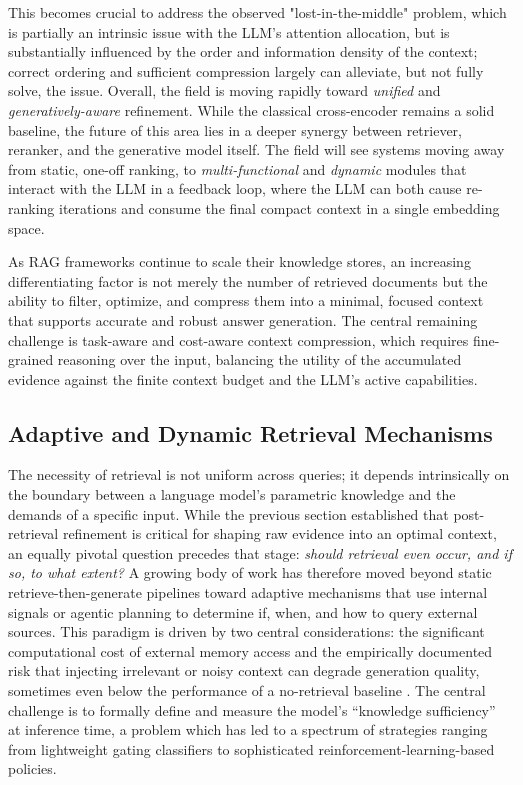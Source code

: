 \documentclass[11pt,a4paper]{article}
\begin{document}
This becomes crucial to address the observed "lost-in-the-middle" problem, which is partially an intrinsic issue with the LLM's attention allocation, but is substantially influenced by the order and information density of the context; correct ordering and sufficient compression largely can alleviate, but not fully solve, the issue. Overall, the field is moving rapidly toward \emph{unified} and \emph{generatively-aware} refinement. While the classical cross-encoder remains a solid baseline, the future of this area lies in a deeper synergy between retriever, reranker, and the generative model itself. The field will see systems moving away from static, one-off ranking, to \emph{multi-functional} and \emph{dynamic} modules that interact with the LLM in a feedback loop, where the LLM can both cause re-ranking iterations and consume the final compact context in a single embedding space.

As RAG frameworks continue to scale their knowledge stores, an increasing differentiating factor is not merely the number of retrieved documents but the ability to filter, optimize, and compress them into a minimal, focused context that supports accurate and robust answer generation. The central remaining challenge is task-aware and cost-aware context compression, which requires fine-grained reasoning over the input, balancing the utility of the accumulated evidence against the finite context budget and the LLM's active capabilities.


\subsection{Adaptive and Dynamic Retrieval Mechanisms}


The necessity of retrieval is not uniform across queries; it depends intrinsically on the boundary between a language model's parametric knowledge and the demands of a specific input. While the previous section established that post-retrieval refinement is critical for shaping raw evidence into an optimal context, an equally pivotal question precedes that stage: \emph{should retrieval even occur, and if so, to what extent?} A growing body of work has therefore moved beyond static retrieve-then-generate pipelines toward adaptive mechanisms that use internal signals or agentic planning to determine if, when, and how to query external sources. This paradigm is driven by two central considerations: the significant computational cost of external memory access and the empirically documented risk that injecting irrelevant or noisy context can degrade generation quality, sometimes even below the performance of a no-retrieval baseline \cite{arxiv:2401.14887v3}. The central challenge is to formally define and measure the model's ``knowledge sufficiency'' at inference time, a problem which has led to a spectrum of strategies ranging from lightweight gating classifiers to sophisticated reinforcement-learning-based policies.
\end{document}
